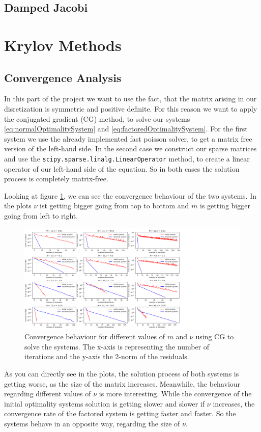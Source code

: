 \documentclass{amsart}
\theoremstyle{definition}
\theoremstyle{remark}
\numberwithin{equation}{section}
\begin{document}
\subsection{Damped Jacobi}
\label{sec:DampedJacobi}
\newpage
\section{Krylov Methods}

\subsection{Convergence Analysis}
In this part of the project we want to use the fact, that the matrix arising in our disretization is symmetric and positive definite. For this reason we 
want to apply the conjugated gradient (CG) method, to solve our systems \eqref{eq:normalOptimalitySystem} and \eqref{eq:factoredOptimalitySystem}.
For the first system we use the already implemented fast poisson solver, to get a matrix free version of the left-hand side. In the second case we 
construct our sparse matrices and use the \texttt{scipy.sparse.linalg.LinearOperator} method, to create a linear operator of our left-hand side of the 
equation. So in both cases the solution process is completely matrix-free.


Looking at figure \ref{fig:CG-convergence}, we can see the  convergence behaviour of the two systems. In the plots $\nu$ ist getting bigger going from top to bottom and $m$ is getting bigger going from left to right.
\begin{figure}[h!]
\centering
\includegraphics[scale=0.52]{./imgs/CG_analysis}
\caption{Convergence behaviour for different values of $m$ and $\nu$ using CG to solve the systems. The x-axis is representing the number of iterations
and the y-axis the 2-norm of the residuals.}
\label{fig:CG-convergence}
\end{figure}
As you can directly see in the plots, the solution process of both systems is getting worse, as the size of the matrix increases. Meanwhile, the behaviour 
regarding different values of $\nu$ is more interesting. While the convergence of the initial optimality systems solution is getting slower and slower if 
$\nu$ increases, the convergence rate of the factored system is getting faster and faster. So the systems behave in an opposite way, regarding the size of 
$\nu$.
\end{document}
